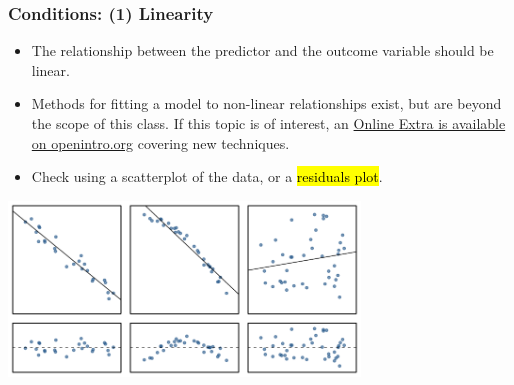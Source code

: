 \documentclass[notes,11pt, aspectratio=169]{beamer}
\begin{document}
\begin{frame}
\frametitle{Conditions: (1) Linearity}

\begin{itemize}

\item The relationship between the predictor and the outcome variable should be linear. 

\pause

\item Methods for fitting a model to non-linear relationships exist, but are beyond the scope of this class. If this topic is of interest, an \href{http://www.openintro.org/download.php?file=os2_extra_nonlinear_relationships&referrer=/stat/textbook.php}{Online Extra is available on openintro.org} covering new techniques.

\pause

\item Check using a scatterplot of the data, or a \hl{residuals plot}.

\end{itemize}

\begin{center}
\includegraphics[width=0.7\textwidth]{graphs/l08f08}
\end{center}

\end{frame}

\end{document}
